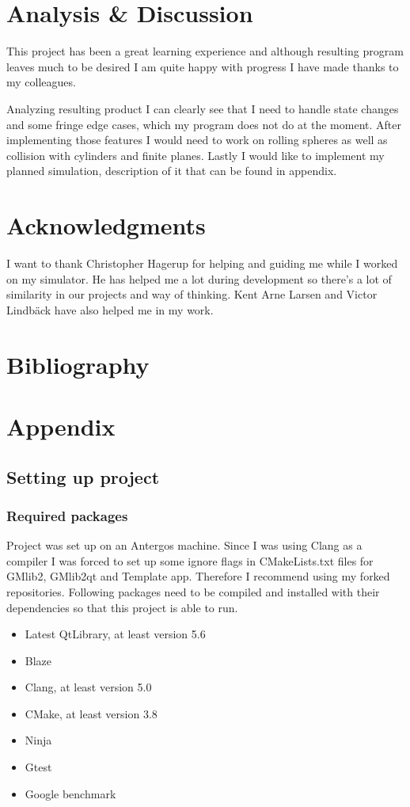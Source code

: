 \documentclass[a4,10pt]{article}
\begin{document}
\section{Analysis \& Discussion}
This project has been a great learning experience and although resulting program leaves much to be desired I am quite happy with progress I have made thanks to my colleagues.

Analyzing resulting product I can clearly see that I need to handle state changes and some fringe edge cases, which my program does not do at the moment. After implementing those features I would need to work on rolling spheres as well as collision with cylinders and finite planes. Lastly I would like to implement my planned simulation, description of it that can be found in appendix.

\section{Acknowledgments}
I want to thank Christopher Hagerup for helping and guiding me while I worked on my simulator. He has helped me a lot during development so there's a lot of similarity in our projects and way of thinking. Kent Arne Larsen and Victor Lindb\"{a}ck have also helped me in my work.

\section{Bibliography}
\begingroup
  \def\section*#1{}
  
  
\endgroup

\section{Appendix}
\subsection{Setting up project}
\subsubsection{Required packages}
Project was set up on an Antergos machine. Since I was using Clang as a compiler I was forced to set up some ignore flags in CMakeLists.txt files for GMlib2, GMlib2qt and Template app. Therefore I recommend using my forked repositories. Following packages need to be compiled and installed with their dependencies so that this project is able to run.
\begin{itemize}
  \item Latest QtLibrary, at least version 5.6
  \item Blaze
  \item Clang, at least version 5.0
  \item CMake, at least version 3.8
  \item Ninja
  \item Gtest
  \item Google benchmark
\end{itemize}
\end{document}
